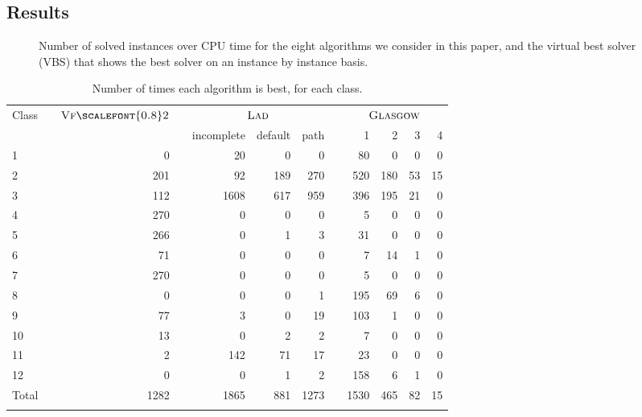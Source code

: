 \documentclass{llncs}
\newcommand{\VFtwo}{$\textsc{Vf{\scalefont{0.8}2}}$\xspace}
\newcommand{\Glasgow}{$\textsc{Glasgow}$\xspace}
\newcommand{\LAD}{$\textsc{Lad}$\xspace}
\begin{document}
\subsection{Results}\label{expComp}

\begin{figure}[p]
    \centering
    \vspace{-0.5cm}

    \caption{Number of solved instances over CPU time for the eight algorithms we
        consider in this paper, and the virtual best solver (VBS) that shows the best
    solver on an instance by instance basis.\label{expTimeGraph}}
\end{figure}

\begin{table}[p]
\centering
\begin{tabularx}{.8\textwidth}{XXrXrrrXrrrr}
\toprule
Class && \VFtwo && \multicolumn{3}{c}{\LAD} && \multicolumn{4}{c}{\hspace*{2em}\Glasgow}\\
&&&&incomplete&default&path&&1&2&3&4\\
\midrule
1 &&        0 &&       20 &        0 &        0 &&       80 &        0 &        0 &        0 \\
2 &&      201 &&       92 &      189 &      270 &&      520 &      180 &       53 &       15 \\
3 &&      112 &&     1608 &      617 &      959 &&      396 &      195 &       21 &        0 \\
4 &&      270 &&        0 &        0 &        0 &&        5 &        0 &        0 &        0 \\
5 &&      266 &&        0 &        1 &        3 &&       31 &        0 &        0 &        0 \\
6 &&       71 &&        0 &        0 &        0 &&        7 &       14 &        1 &        0 \\
7 &&      270 &&        0 &        0 &        0 &&        5 &        0 &        0 &        0 \\
8 &&        0 &&        0 &        0 &        1 &&      195 &       69 &        6 &        0 \\
9 &&       77 &&        3 &        0 &       19 &&      103 &        1 &        0 &        0 \\
10 &&       13 &&        0 &        2 &        2 &&        7 &        0 &        0 &        0 \\
11 &&        2 &&      142 &       71 &       17 &&       23 &        0 &        0 &        0 \\
12 &&        0 &&        0 &        1 &        2 &&      158 &        6 &        1 &        0 \\
\midrule
Total && 1282 && 1865 & 881 & 1273 && 1530 & 465 & 82& 15\\
\bottomrule \\
\end{tabularx}
\caption{Number of times each algorithm is best, for each class.\label{expClass}}
\end{table}
\end{document}
